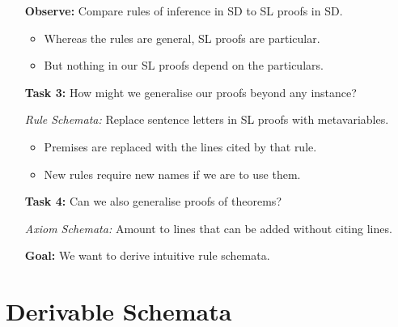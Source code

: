 \documentclass[a4paper, 11pt]{article} %
\begin{document}
\begin{enumerate}
  \item[\bf Observe:] Compare rules of inference in SD to SL proofs in SD.
    \begin{itemize}
      \item Whereas the rules are general, SL proofs are particular.
      \item But nothing in our SL proofs depend on the particulars.
    \end{itemize}
  \item[\bf Task 3:] How might we generalise our proofs beyond any instance?
  \item[\it Rule Schemata:] Replace sentence letters in SL proofs with metavariables.
    \begin{itemize}
      \item Premises are replaced with the lines cited by that rule.
      \item New rules require new names if we are to use them.
    \end{itemize}
  \item[\bf Task 4:] Can we also generalise proofs of theorems?
  \item[\it Axiom Schemata:] Amount to lines that can be added without citing lines. 
  \item[\bf Goal:] We want to derive intuitive rule schemata.
\end{enumerate}


\section*{Derivable Schemata}
\end{document}

